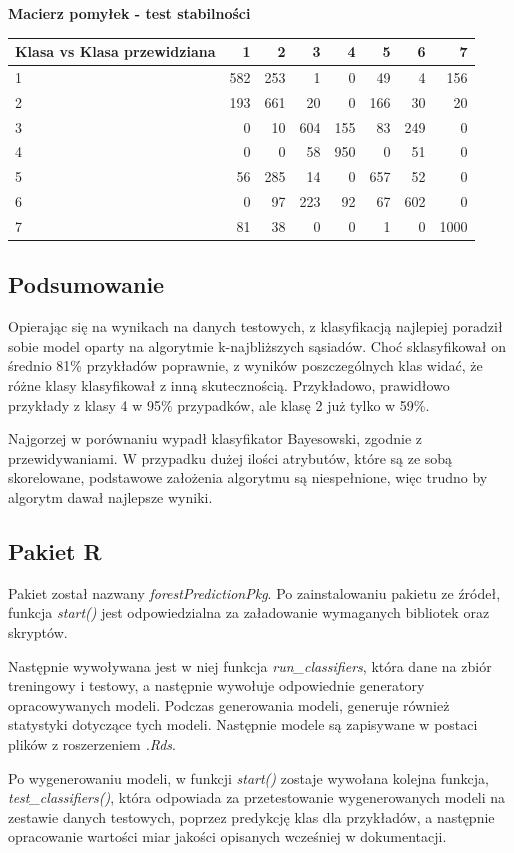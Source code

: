\documentclass[11pt]{article} %
\begin{document}
\textbf{Macierz pomyłek - test stabilności}

\begin{center}
    \begin{tabular}{ | l | r | r | r | r | r | r | r | }
    \hline
 Klasa vs Klasa przewidziana &  1 &  2 &  3 &  4 &  5 &  6 &  7 \\ \hline
1 &  582 & 253 &  1 &  0 & 49 &  4 & 156 \\
2 &  193 & 661 & 20 &  0 & 166 & 30 & 20 \\
3 &   0 & 10 & 604 & 155 & 83 & 249 &  0 \\
4 &  0  & 0 & 58 & 950 &  0 & 51 &  0\\
5 & 56 & 285 & 14 &  0 & 657 &  52 &  0 \\
6 &  0  & 97 &  223 & 92  & 67 & 602 &  0 \\
7 & 81 & 38 &  0  & 0  & 1  & 0 & 1000 \\ \hline
    \end{tabular}
\end{center}

\subsection{Podsumowanie}

Opierając się na wynikach na danych testowych, z klasyfikacją najlepiej poradził sobie model oparty na algorytmie k-najbliższych sąsiadów. 
Choć sklasyfikował on średnio 81\% przykładów poprawnie, z wyników poszczególnych klas widać, że różne klasy klasyfikował z inną skutecznością. Przykładowo, prawidłowo przykłady z klasy 4 w 95\% przypadków, ale  klasę 2 już tylko w 59\%.

Najgorzej w porównaniu wypadł klasyfikator Bayesowski, zgodnie z przewidywaniami. W przypadku dużej ilości atrybutów, które są ze sobą skorelowane, podstawowe założenia algorytmu są niespełnione, więc trudno by algorytm dawał najlepsze wyniki.

\subsection{Pakiet R}

Pakiet został nazwany \emph{forestPredictionPkg}. Po zainstalowaniu pakietu ze źródeł, funkcja \emph{start()} jest odpowiedzialna za załadowanie wymaganych bibliotek oraz skryptów. 

Następnie wywoływana jest w niej funkcja \emph{run\_classifiers}, która dane na zbiór treningowy i testowy, a następnie wywołuje odpowiednie generatory opracowywanych modeli. Podczas generowania modeli, generuje również statystyki dotyczące tych modeli. Następnie modele są zapisywane w postaci plików z roszerzeniem \emph{.Rds}.

Po wygenerowaniu modeli, w funkcji  \emph{start()} zostaje wywołana kolejna funkcja, \emph{test\_classifiers()}, która odpowiada za przetestowanie wygenerowanych modeli na zestawie danych testowych, poprzez predykcję klas dla przykładów, a następnie opracowanie wartości miar jakości opisanych wcześniej w dokumentacji.
\end{document}
